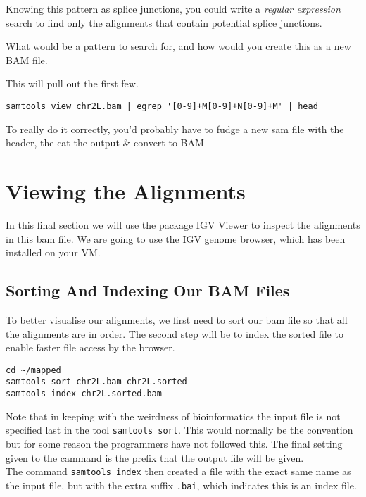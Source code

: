 \begin{advanced}
Knowing this pattern as splice junctions, you could write a \textit{regular expression} search to find only the alignments that contain potential splice junctions.
\begin{questions}
What would be a pattern to search for, and how would you create this as a new BAM file.
\end{questions}
\begin{answer}
This will pull out the first few.
\begin{lstlisting}
samtools view chr2L.bam | egrep '[0-9]+M[0-9]+N[0-9]+M' | head
\end{lstlisting}
To really do it correctly, you'd probably have to fudge a new sam file with the header, the cat the output \& convert to BAM
\end{answer}
\end{advanced}

\section{Viewing the Alignments}
In this final section we will use the package IGV Viewer to inspect the alignments in this bam file.
We are going to use the IGV genome browser, which has been installed on your VM.

\subsection{Sorting And Indexing Our BAM Files}
To better visualise our alignments, we first need to sort our bam file so that all the alignments are in order.
The second step will be to index the sorted file to enable faster file access by the browser.

\begin{lstlisting}
cd ~/mapped
samtools sort chr2L.bam chr2L.sorted
samtools index chr2L.sorted.bam
\end{lstlisting}

Note that in keeping with the weirdness of bioinformatics the input file is not specified last in the tool \texttt{samtools sort}.
This would normally be the convention but for some reason the programmers have not followed this.
The final setting given to the cammand is the prefix that the output file will be given. \\

The command \texttt{samtools index} then created a file with the exact same name as the input file, but with the extra suffix \texttt{.bai}, which indicates this is an index file.

